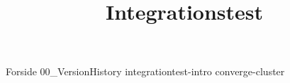 \documentclass[a4paper,openany]{memoir}
\title{Integrationstest}
\begin{document}
	{Forside}  \newpage
	\tableofcontents\thispagestyle{fancy}
	{00_VersionHistory}  \newpage
	{integrationtest-intro}  \newpage
	{converge-cluster}  \newpage


	 {}
	\printbibliography
\end{document}
